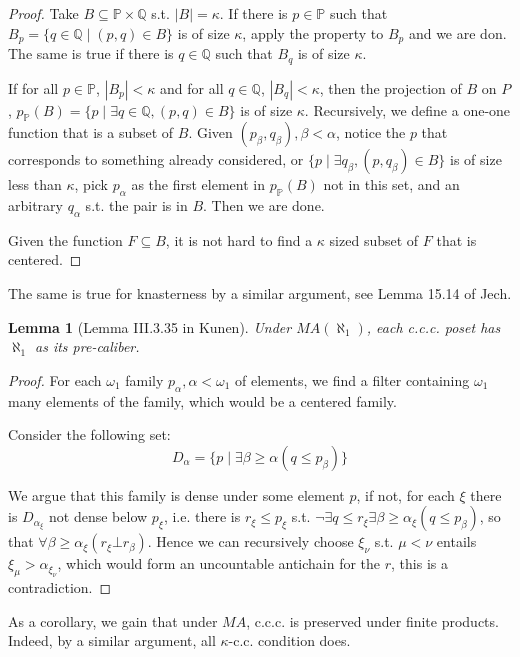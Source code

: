\documentclass{article}
\newtheorem{lemma}{Lemma}
\newcommand{\bbP}{\mathbb{P}}
\newcommand{\bbQ}{\mathbb{Q}}
\begin{document}
\begin{proof}
    Take $B\subseteq \bbP\times \bbQ$ s.t. $|B| = \kappa$.
    If there is $p\in \bbP$ such that $B_p = \{q\in \bbQ\mid (p,q)\in B\}$ is of size $\kappa$, apply the property to $B_p$ and we are don. The same is true if there is $q\in \bbQ$ such that $B_q$ is of size $\kappa$.

    If for all $p\in \bbP$, $|B_p|<\kappa$  and for all $q\in \bbQ$, $|B_q|<\kappa$, then the projection of $B$ on $P$, $p_\bbP(B) = \{p\mid \exists q\in \bbQ, (p,q)\in B\}$ is of size $\kappa$. Recursively, we define a one-one function that is a subset of $B$. Given $(p_\beta,q_\beta),\beta<\alpha$, notice the $p$ that corresponds to something already considered, or $\{p\mid \exists q_\beta,(p,q_\beta)\in B\}$ is of size less than $\kappa$, pick $p_\alpha$ as the first element in $p_\bbP(B) $ not in this set, and an arbitrary $q_\alpha$ s.t. the pair is in $B$. Then we are done.

    Given the function $F\subseteq B$, it is not hard to find a $\kappa$ sized subset of $F$ that is centered.
\end{proof}

The same is true for knasterness by a similar argument, see Lemma 15.14 of Jech.

\begin{lemma}[Lemma III.3.35 in Kunen]
    Under $MA(\aleph_1)$, each c.c.c. poset has $\aleph_1$ as its pre-caliber.
\end{lemma}

\begin{proof}
    For each $\omega_1$ family $p_\alpha,\alpha<\omega_1$ of elements, we find a filter containing $\omega_1$ many elements of the family, which would be a centered family.

    Consider the following set: $$D_\alpha = \{p\mid \exists \beta\geq \alpha (q\leq p_\beta)\}$$

    We argue that this family is dense under some element $p$, if not, for each $\xi$ there is $D_{\alpha_\xi}$ not dense below $p_\xi$, i.e. there is $r_\xi\leq p_\xi$ s.t. $\neg \exists q\leq r_\xi \exists \beta\geq \alpha_\xi(q\leq p_\beta)$, so that $\forall \beta \geq \alpha_\xi(r_\xi \bot r_\beta)$. Hence we can recursively choose $\xi_\nu$ s.t. $\mu<\nu$ entails $\xi_\mu>\alpha_{\xi_\nu}$, which would form an uncountable antichain for the $r$, this is a contradiction.
\end{proof}

As a corollary, we gain that under $MA$, c.c.c. is preserved under finite products. Indeed, by a similar argument, all $\kappa$-c.c. condition does. 
\end{document}
